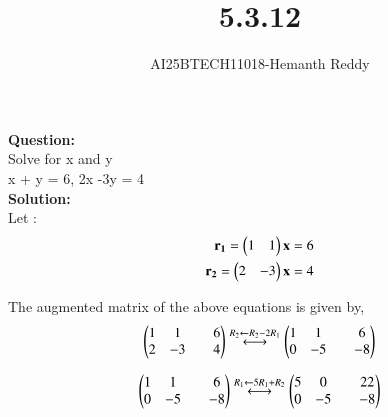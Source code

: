 \documentclass[journal]{IEEEtran}
\begin{document}

\vspace{3cm}

\title{5.3.12}
\author{AI25BTECH11018-Hemanth Reddy}
 \maketitle
{\let\newpage\relax\maketitle}

\renewcommand{\thefigure}{\theenumi}
\renewcommand{\thetable}{\theenumi}
\setlength{\intextsep}{10pt} %


\renewcommand{\thetable}{\theenumi}

\textbf{Question:}\\

Solve for x and y\\

x + y = 6, 2x -3y = 4\\
\textbf{Solution:}\\

Let :
\begin{align}
    \mathbf{r_1} = \begin{pmatrix}1 & 1 \end{pmatrix}\mathbf{x} = 6 \\
    \mathbf{r_2} = \begin{pmatrix}2 & -3\end{pmatrix}\mathbf{x} = 4
\end{align}

The augmented matrix of the above equations is given by,\\
\begin{align}
    \begin{pmatrix} 1&1&&6\\ 2&-3&&4\end{pmatrix} \stackrel{R_2 \leftarrow R_2 - 2R_1}{\longleftrightarrow}\begin{pmatrix} 1&1&&6\\ 0&-5&&-8\end{pmatrix} 
\end{align}

\begin{align}
    \begin{pmatrix} 1&1&&6\\ 0&-5&&-8\end{pmatrix} \stackrel{R_1 \leftarrow 5R_1 +R_2}{\longleftrightarrow}\begin{pmatrix} 5&0&&22\\ 0&-5&&-8\end{pmatrix} 
\end{align}
\end{document}
